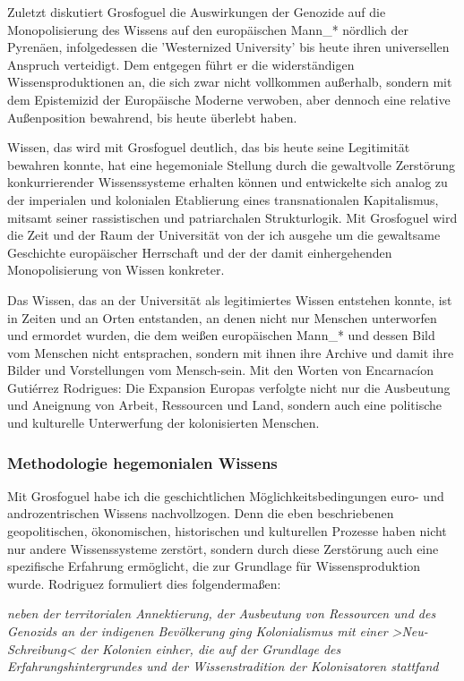 Zuletzt diskutiert Grosfoguel die Auswirkungen der Genozide auf die
Monopolisierung des Wissens auf den europäischen Mann\_* nördlich der Pyrenäen,
infolgedessen die 'Westernized University' bis heute ihren universellen
Anspruch verteidigt. Dem entgegen führt er die widerständigen
Wissensproduktionen an, die sich zwar nicht vollkommen außerhalb, sondern mit
dem Epistemizid der Europäische Moderne verwoben, aber dennoch eine relative
Außenposition bewahrend, bis heute überlebt haben.\footnotemark {}

Wissen, das wird mit Grosfoguel deutlich, das bis heute seine Legitimität
bewahren konnte, hat eine hegemoniale Stellung durch die gewaltvolle Zerstörung
konkurrierender Wissenssysteme erhalten können und entwickelte sich analog zu
der imperialen und kolonialen Etablierung eines transnationalen Kapitalismus,
mitsamt seiner rassistischen und patriarchalen Strukturlogik. 
Mit Grosfoguel wird die Zeit und der Raum der Universität von der ich ausgehe um die
gewaltsame Geschichte europäischer Herrschaft und der der damit einhergehenden
Monopolisierung von Wissen konkreter.

Das Wissen, das an der Universität als legitimiertes Wissen entstehen konnte,
ist in Zeiten und an Orten entstanden, an denen nicht nur Menschen unterworfen
und ermordet wurden, die dem weißen europäischen Mann\_* und dessen Bild vom
Menschen nicht entsprachen, sondern mit ihnen ihre Archive und damit ihre
Bilder und Vorstellungen vom Mensch-sein. Mit den Worten von Encarnacíon
Gutiérrez Rodrigues: \glqq Die Expansion Europas verfolgte nicht nur die Ausbeutung
und Aneignung von Arbeit, Ressourcen und Land, sondern auch eine politische und
kulturelle Unterwerfung der kolonisierten Menschen. \grqq \footnotemark
{}
\subsubsection{Methodologie hegemonialen Wissens}
Mit Grosfoguel habe ich die geschichtlichen Möglichkeitsbedingungen euro- und androzentrischen Wissens nachvollzogen. Denn die eben beschriebenen geopolitischen, ökonomischen, historischen und kulturellen Prozesse haben nicht nur andere Wissenssysteme zerstört, sondern durch diese Zerstörung auch eine spezifische Erfahrung ermöglicht, die zur Grundlage für Wissensproduktion wurde. Rodriguez formuliert dies folgendermaßen:
\begin{myenv}
  \textit{
  \glqq
[....] neben der territorialen Annektierung, der Ausbeutung von Ressourcen und des Genozids an der indigenen Bevölkerung ging Kolonialismus mit einer >Neu-Schreibung< der Kolonien einher, die auf der Grundlage des Erfahrungshintergrundes und der Wissenstradition der Kolonisatoren stattfand
\grqq } \footnotemark {}
\end{myenv}

